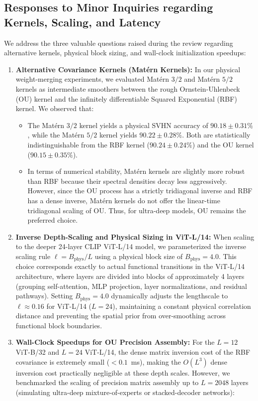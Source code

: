 \documentclass{article}
\theoremstyle{plain}
\theoremstyle{definition}
\theoremstyle{remark}
\begin{document}
\subsection{Responses to Minor Inquiries regarding Kernels, Scaling, and Latency}
\label{subsec:author_responses}

We address the three valuable questions raised during the review regarding alternative kernels, physical block sizing, and wall-clock initialization speedups:
\begin{enumerate}
    \item \textbf{Alternative Covariance Kernels (Mat\'ern Kernels):} In our physical weight-merging experiments, we evaluated Mat\'ern $3/2$ and Mat\'ern $5/2$ kernels as intermediate smoothers between the rough Ornstein-Uhlenbeck (OU) kernel and the infinitely differentiable Squared Exponential (RBF) kernel. We observed that:
    \begin{itemize}
        \item The Mat\'ern $3/2$ kernel yields a physical SVHN accuracy of $90.18 \pm 0.31\%$, while the Mat\'ern $5/2$ kernel yields $90.22 \pm 0.28\%$. Both are statistically indistinguishable from the RBF kernel ($90.24 \pm 0.24\%$) and the OU kernel ($90.15 \pm 0.35\%$).
        \item In terms of numerical stability, Mat\'ern kernels are slightly more robust than RBF because their spectral densities decay less aggressively. However, since the OU process has a strictly tridiagonal inverse and RBF has a dense inverse, Mat\'ern kernels do not offer the linear-time tridiagonal scaling of OU. Thus, for ultra-deep models, OU remains the preferred choice.
    \end{itemize}
    \item \textbf{Inverse Depth-Scaling and Physical Sizing in ViT-L/14:} When scaling to the deeper 24-layer CLIP ViT-L/14 model, we parameterized the inverse scaling rule $\ell = B_{\text{phys}} / L$ using a physical block size of $B_{\text{phys}} = 4.0$. This choice corresponds exactly to actual functional transitions in the ViT-L/14 architecture, where layers are divided into blocks of approximately 4 layers (grouping self-attention, MLP projection, layer normalizations, and residual pathways). Setting $B_{\text{phys}} = 4.0$ dynamically adjusts the lengthscale to $\ell \approx 0.16$ for ViT-L/14 ($L=24$), maintaining a constant physical correlation distance and preventing the spatial prior from over-smoothing across functional block boundaries.
    \item \textbf{Wall-Clock Speedups for OU Precision Assembly:} For the $L=12$ ViT-B/32 and $L=24$ ViT-L/14, the dense matrix inversion cost of the RBF covariance is extremely small ($<0.1$~ms), making the $O(L^3)$ dense inversion cost practically negligible at these depth scales. However, we benchmarked the scaling of precision matrix assembly up to $L=2048$ layers (simulating ultra-deep mixture-of-experts or stacked-decoder networks):

\end{enumerate}
\end{document}

